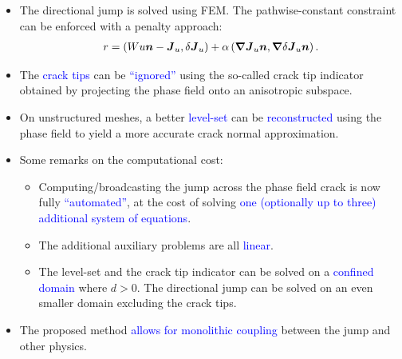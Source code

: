\begin{frame}
    \begin{itemize}
        \item The directional jump is solved using FEM. The pathwise-constant constraint can be enforced with a penalty approach:
              \begin{align*}
                  r = \left( W u \boldsymbol{n} - \boldsymbol{J}_u, \delta \boldsymbol{J}_u \right) + \alpha \left( \boldsymbol{\nabla} \boldsymbol{J}_u \boldsymbol{n}, \boldsymbol{\nabla} \delta\boldsymbol{J}_u \boldsymbol{n} \right).
              \end{align*}
        \item<4-> The \textcolor{blue}{crack tips} can be \textcolor{blue}{``ignored''} using the so-called crack tip indicator obtained by projecting the phase field onto an anisotropic subspace.
        \item<5-> On unstructured meshes, a better \textcolor{blue}{level-set} can be \textcolor{blue}{reconstructed} using the phase field to yield a more accurate crack normal approximation.
        \item<6-> Some remarks on the computational cost:
            \begin{itemize}
                \item Computing/broadcasting the jump across the phase field crack is now fully \textcolor{blue}{``automated''}, at the cost of solving \textcolor{blue}{one (optionally up to three) additional system of equations}.
                \item The additional auxiliary problems are all \textcolor{blue}{linear}.
                \item The level-set and the crack tip indicator can be solved on a \textcolor{blue}{confined domain} where $d > 0$. The directional jump can be solved on an even smaller domain excluding the crack tips.
            \end{itemize}
        \item<7-> The proposed method \textcolor{blue}{allows for monolithic coupling} between the jump and other physics.
    \end{itemize}
    \vspace{-70pt}
\end{frame}
